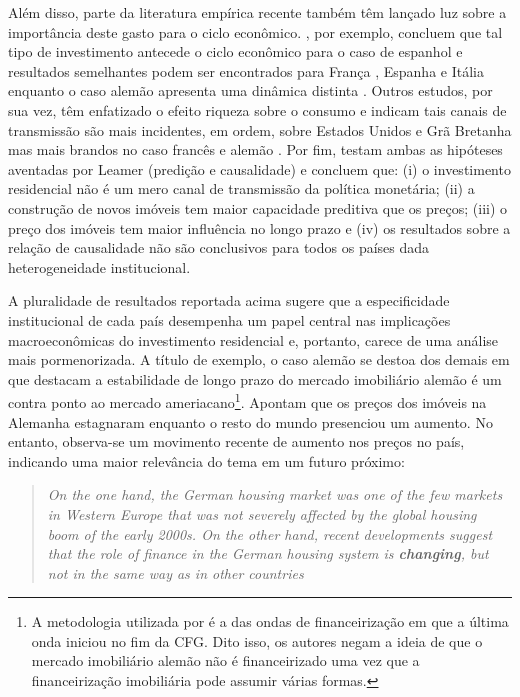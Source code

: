 Além disso, parte da literatura empírica recente também têm lançado luz sobre a importância deste gasto para o ciclo econômico. \textcite{alvarez_does_2010}, por exemplo, concluem que tal tipo de investimento antecede o ciclo econômico para o caso de espanhol e resultados semelhantes podem ser encontrados para França \cite{ferrara_cyclical_2010}, Espanha  e Itália enquanto o caso alemão apresenta uma dinâmica distinta \cite{ferrara_common_2010}. 
Outros estudos, por sua vez, têm enfatizado o efeito riqueza sobre o consumo e indicam tais canais de transmissão são mais incidentes, em ordem, sobre Estados Unidos e Grã Bretanha mas mais brandos no caso francês e alemão \cites{sastre_assessment_2010}{chauvin_wealth_2010}{bassanetti_effects_2010}{arrondel_housing_2010}. Por fim, \textcite{huang_is_2018} testam ambas as hipóteses aventadas por Leamer  (predição e causalidade) e concluem que: (i) o investimento residencial não é um mero canal de transmissão da política monetária; (ii) a construção de novos imóveis tem maior capacidade preditiva que os preços; (iii) o preço dos imóveis tem maior influência no longo prazo e (iv) os resultados sobre a relação de causalidade não são conclusivos para todos os países dada heterogeneidade institucional.

A pluralidade de resultados reportada acima sugere que a especificidade institucional de cada país desempenha um papel central nas implicações macroeconômicas do investimento residencial e, portanto, carece de uma análise mais pormenorizada. A título de exemplo, o caso alemão se destoa dos demais em que \textcite{wijburg_alternative_2017} destacam a estabilidade de longo prazo do mercado imobiliário alemão é um contra ponto ao mercado ameriacano\footnote{
	A metodologia utilizada por \textcite{wijburg_alternative_2017} é a das ondas de financeirização em que a última onda iniciou no fim da CFG. Dito isso, os autores negam a ideia de que o mercado imobiliário alemão não é financeirizado uma vez que a financeirização imobiliária pode assumir várias formas.}. 
Apontam que os preços dos imóveis na Alemanha estagnaram enquanto o resto do mundo presenciou um aumento. No entanto, observa-se um movimento recente de aumento nos preços no país, indicando uma maior relevância do tema em um futuro próximo:

\begin{quote}
\textit{On the one hand, the German housing market was one of the few markets in Western Europe that was not severely affected by the global housing boom of the early 2000s. On the other hand, recent developments suggest that the role of finance in the German housing system is \textbf{changing}, but not in the same way as in other countries} \cite[p.~969, grifos adicionados]{wijburg_alternative_2017}
\end{quote}


